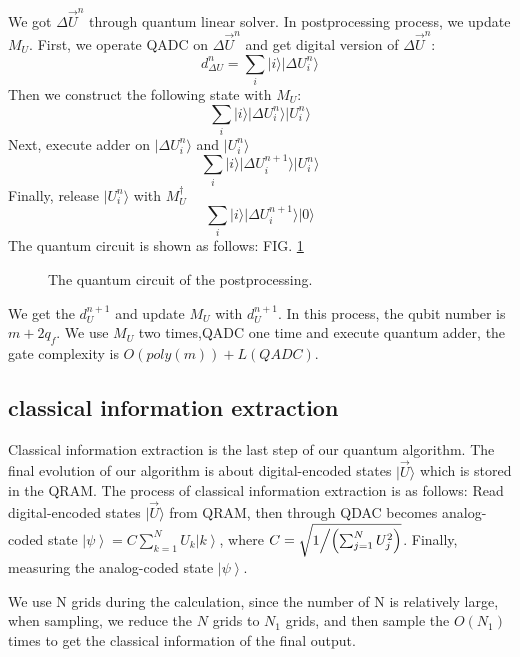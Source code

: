 \documentclass[%
 reprint,
 amsmath,amssymb,
pra,
]{revtex4-1}
\begin{document}
We got $\Delta \vec{U}^n$ through quantum linear solver. In postprocessing process, we update $M_U$. First, we operate QADC on $\Delta \vec{U}^n$ and get digital version of $\Delta \vec{U}^n$:
$$
d_{\Delta U}^n=\sum_i{|i\rangle|\Delta U_i^n\rangle}
$$
Then we construct the following state with $M_U$:
$$
\sum_i{|i\rangle|\Delta U_i^n\rangle|U_i^n\rangle}
$$
Next, execute adder on $|\Delta U_i^n\rangle$ and $|U_i^n\rangle$
$$
\sum_i{|i\rangle|\Delta U_i^{n+1}\rangle|U_i^n\rangle}
$$
Finally, release $|U_i^n\rangle$ with $M_U^{\dagger}$
$$
\sum_i{|i\rangle|\Delta U_i^{n+1}\rangle|0\rangle}
$$
The quantum circuit is shown as follows: FIG. \ref{postprocessing_qcir}
\begin{figure}[htbp]
	 \caption{The quantum circuit of the postprocessing.}
	\label{postprocessing_qcir}
   \end{figure}
We get the $d_U^{n+1}$ and update $M_U$ with $d_U^{n+1}$. In this process, the qubit number is $m+2q_f$. We use $M_U$ two times,QADC one time and execute quantum adder, the gate complexity is $O(poly(m))+L(QADC)$.


\subsection{classical information extraction}
Classical information extraction is the last step of our quantum algorithm. 
The final evolution of our algorithm is about digital-encoded states
$|\vec{U}\rangle$ which is stored in the QRAM. 
The process of classical information extraction is as follows: 
Read digital-encoded states $|\vec{U}\rangle$ from QRAM, 
then through QDAC becomes analog-coded state $\left| \psi  \right\rangle  = C\sum\limits_{k = 1}^N {{U_k}\left| k \right\rangle } $,
where $C = \sqrt {{1 \mathord{\left/
{\vphantom {1 {\left( {\sum\nolimits_{j = 1}^N {U_j^2} } \right)}}} \right.
\kern-\nulldelimiterspace} {\left( {\sum\nolimits_{j = 1}^N {U_j^2} } \right)}}} $.
Finally, measuring the analog-coded state $\left| \psi  \right\rangle $.

We use N grids during the calculation,
since the number of N is relatively large,
when sampling, we reduce the $N$ grids to $N_1$ grids, 
and then sample the $O(N_1)$ times to get the classical information of the final output.
\end{document}
